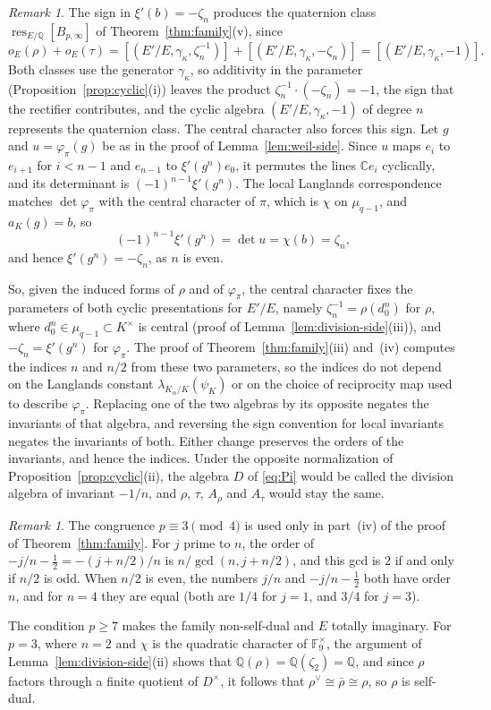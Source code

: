 \documentclass[a4paper,11pt]{amsart}
\theoremstyle{definition}
\theoremstyle{remark}
\newtheorem{remark}[theorem]{Remark}
\numberwithin{equation}{section}
\newcommand{\Q}{\mathbb{Q}}
\DeclareMathOperator{\res}{res}
\newcommand{\F}{\mathbb{F}}
\newcommand{\C}{\mathbb{C}}
\newcommand{\Bpinf}{B_{p,\infty}}
\begin{document}
\begin{remark}\label{rem:sign}
The sign in $\xi'(b)=-\zeta_n$ produces the quaternion class $\res_{E/\Q}[\Bpinf]$ of Theorem~\ref{thm:family}(v), since
\[
 o_E(\rho)+o_E(\tau)=[(E'/E,\gamma_\kappa,\zeta_n^{-1})]+[(E'/E,\gamma_\kappa,-\zeta_n)]=[(E'/E,\gamma_\kappa,-1)].
\]
Both classes use the generator $\gamma_\kappa$, so additivity in the parameter (Proposition~\ref{prop:cyclic}(i)) leaves the product $\zeta_n^{-1}\cdot(-\zeta_n)=-1$, the sign that the rectifier contributes, and the cyclic algebra $(E'/E,\gamma_\kappa,-1)$ of degree $n$ represents the quaternion class. The central character also forces this sign. Let $g$ and $u=\varphi_\pi(g)$ be as in the proof of Lemma~\ref{lem:weil-side}. Since $u$ maps $e_i$ to $e_{i+1}$ for $i<n-1$ and $e_{n-1}$ to $\xi'(g^n)e_0$, it permutes the lines $\C e_i$ cyclically, and its determinant is $(-1)^{n-1}\xi'(g^n)$. The local Langlands correspondence matches $\det\varphi_\pi$ with the central character of $\pi$, which is $\chi$ on $\mu_{q-1}$, and $a_K(g)=b$, so
\[
 (-1)^{n-1}\xi'(g^n)=\det u=\chi(b)=\zeta_n,
\]
and hence $\xi'(g^n)=-\zeta_n$, as $n$ is even.

So, given the induced forms of $\rho$ and of $\varphi_\pi$, the central character fixes the parameters of both cyclic presentations for $E'/E$, namely $\zeta_n^{-1}=\rho(d_0^n)$ for $\rho$, where $d_0^n\in\mu_{q-1}\subset K^\times$ is central (proof of Lemma~\ref{lem:division-side}(iii)), and $-\zeta_n=\xi'(g^n)$ for $\varphi_\pi$. The proof of Theorem~\ref{thm:family}(iii) and~(iv) computes the indices $n$ and $n/2$ from these two parameters, so the indices do not depend on the Langlands constant $\lambda_{K_\alpha/K}(\psi_K)$ or on the choice of reciprocity map used to describe $\varphi_\pi$. Replacing one of the two algebras by its opposite negates the invariants of that algebra, and reversing the sign convention for local invariants negates the invariants of both. Either change preserves the orders of the invariants, and hence the indices. Under the opposite normalization of Proposition~\ref{prop:cyclic}(ii), the algebra $D$ of \eqref{eq:Pi} would be called the division algebra of invariant $-1/n$, and $\rho$, $\tau$, $A_\rho$ and $A_\tau$ would stay the same.
\end{remark}

\begin{remark}\label{rem:family-hypotheses}
The congruence $p\equiv3\pmod4$ is used only in part~(iv) of the proof of Theorem~\ref{thm:family}. For $j$ prime to $n$, the order of $-j/n-\frac12=-(j+n/2)/n$ is $n/\gcd(n,j+n/2)$, and this gcd is $2$ if and only if $n/2$ is odd. When $n/2$ is even, the numbers $j/n$ and $-j/n-\frac12$ both have order $n$, and for $n=4$ they are equal (both are $1/4$ for $j=1$, and $3/4$ for $j=3$).

The condition $p\ge7$ makes the family non-self-dual and $E$ totally imaginary. For $p=3$, where $n=2$ and $\chi$ is the quadratic character of $\F_9^\times$, the argument of Lemma~\ref{lem:division-side}(ii) shows that $\Q(\rho)=\Q(\zeta_2)=\Q$, and since $\rho$ factors through a finite quotient of $D^\times$, it follows that $\rho^\vee\cong\bar\rho\cong\rho$, so $\rho$ is self-dual.
\end{remark}
\end{document}
